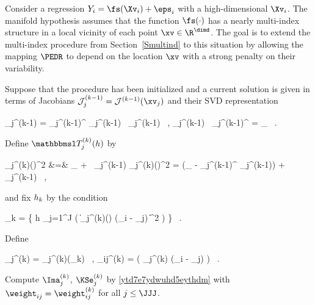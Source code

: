 
Consider a regression \( Y_{i} = \fs(\Xv_{i}) + \eps_{i} \) with a high-dimensional \( \Xv_{i} \).
The manifold hypothesis assumes that the function \( \fs(\cdot) \) has a nearly multi-index structure in a local vicinity 
of each point \( \xv \in \R^{\dimd} \).
The goal is to extend the multi-index procedure from Section~\ref{Smultind} to this situation 
by allowing the mapping \( \PEDR \) to depend on the location \( \xv \) with a strong penalty on their variability.

Suppose that the procedure has been initialized and a current solution is given in terms of 
Jacobians \( \JEDR_{j}^{(k-1)} = \JEDR^{(k-1)}(\xv_{j}) \) and their SVD representation
\begin{EQA}[c]
	\JEDR_{j}^{(k-1)}
	=
	{\PEDR_{j}^{(k-1)}}^{\T} \Lambda_{j}^{(k-1)} \, \PEDR_{j}^{(k-1)} 
	\, , 
	\qquad
	\PEDR_{j}^{(k-1)} \, {\PEDR_{j}^{(k-1)}}^{\T}
	=
	\Id_{\dimm}
	\, .
\end{EQA}
Define \( \TEDR_{j}^{(k)}(\hiso) \) by
\begin{EQA}[rcl]
	\TEDR_{j}^{(k)}(\hiso)^{2}
	&=&
	 \Id_{\dimd} +  \, \JEDR_{j}^{(k-1)}
	\qquad
	\quad
	\TEDR_{j}^{(k)}(\hiso)^{2}
	=
	 (\Id_{\dimd} - {\PEDR_{j}^{(k-1)}}^{\T} \PEDR_{j}^{(k-1)}) 
	+  \, \JEDR_{j}^{(k-1)}
	\, ,
\end{EQA}
and fix \( h_{k} \) by the condition
\begin{EQA}[c]
	\hiso_{k}
	=
	\inf \biggl\{ h \colon
	 \sum_{j=1}^{J} \sumi 
		\Kern\bigl( \| \TEDR_{j}^{(k)}(\hiso) \; (\Xv_{i} - \xv_{j}) \|^{2} \bigr)
	\geq 
	\nmin
	\biggr\}
	\, .
\label{jhgiverkytde4w34etycjamM}
\end{EQA}
Define 
\begin{EQA}[c]
	\TEDR_{j}^{(k)} = \TEDR_{j}^{(k)}(\hiso_{k}) 
	\, ,
	\qquad 	 
	\weight_{ij}^{(k)} = \Kern\bigl( \TEDR_{j}^{(k)} (\Xv_{i} - \xv_{j}) \bigr) 
	\, . 
\end{EQA}
Compute
\( \Ima_{j}^{(k)} \), \( \KSe_{j}^{(k)} \) by \eqref{ytd7e7ydwuhd5eythdm} 
with \( \weight_{ij} = \weight_{ij}^{(k)} \) for all \( j \leq \JJJ \).

